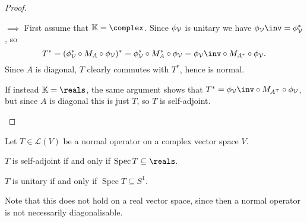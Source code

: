 \documentclass[article, a4paper, 11pt, oneside]{memoir}
\numberwithin{equation}{chapter}
\newcommand{\calL}{\mathcal{L}}
\newcommand{\calV}{\mathcal{V}}
\DeclareMathOperator{\spec}{Spec}
\newcommand{\trans}{^{\top}}
\begin{document}
\begin{proof}
\begin{proofsec}
    \item[\subcref{enum:spectral-multiplication-operator} $\implies$ \subcref{enum:spectral-selfadjoint-normal}]
    First assume that $\mathbb{K} = \complex$. Since $\coordmap{\calV}$ is unitary we have $\coordmap{\calV}\inv = \coordmap{\calV}^*$, so
    \begin{equation*}
        T^*
            = (\coordmap{\calV}^* \circ M_A \circ \coordmap{\calV})^*
            = \coordmap{\calV}^* \circ M_A^* \circ \coordmap{\calV}
            = \coordmap{\calV}\inv \circ M_{A^*} \circ \coordmap{\calV}.
    \end{equation*}
    Since $A$ is diagonal, $T$ clearly commutes with $T^*$, hence is normal.

    If instead $\mathbb{K} = \reals$, the same argument shows that $T^* = \coordmap{\calV}\inv \circ M_{A\trans} \circ \coordmap{\calV}$, but since $A$ is diagonal this is just $T$, so $T$ is self-adjoint.
\end{proofsec}
\end{proof}


\begin{corollary}
    \label{cor:self-adjoint-unitary-eigenvalue-characterisation}
    Let $T \in \calL(V)$ be a normal operator on a complex vector space $V$.
    \begin{enumcor}
        \item \label{enum:self-adjoint-eigenvalue-characterisation} $T$ is self-adjoint if and only if $\spec T \subseteq \reals$.
        \item \label{enum:unitary-eigenvalue-characterisation} $T$ is unitary if and only if $\spec T \subseteq S^1$.
    \end{enumcor}
\end{corollary}
%
Note that this does not hold on a real vector space, since then a normal operator is not necessarily diagonalisable.
\end{document}
